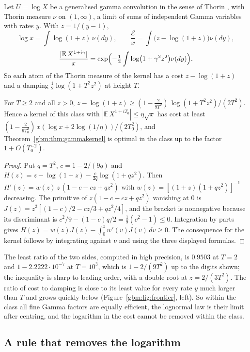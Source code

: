 Let $U=\log X$ be a generalised gamma convolution in the sense of Thorin \cite{Thorin78}, with Thorin measure $\nu$ on $(1,\infty)$, a limit of sums of independent Gamma variables with rates $y$. With $z=1/(y-1)$,
\[
\log x=\int\log(1+z)\,\nu(dy),\qquad\frac{\mathcal E}x=\int\bigl(z-\log(1+z)\bigr)\nu(dy),
\]
\[
\frac{|\mathbb E\,X^{1+i\gamma}|}x=\exp\Bigl(-\tfrac12\int\log\bigl(1+\gamma^2z^2\bigr)\nu(dy)\Bigr).
\]
So each atom of the Thorin measure of the kernel has a cost $z-\log(1+z)$ and a damping $\frac12\log(1+T^2z^2)$ at height $T$.

\begin{proposition}\label{gbm:prop:ggc}
For $T\ge2$ and all $z>0$, $z-\log(1+z)\ge(1-\frac2{9T^2})\,\log(1+T^2z^2)/(2T^2)$. Hence a kernel of this class with $|\mathbb E\,X^{1+iT_0}|\le\eta\sqrt x$ has cost at least $(1-\frac2{9T_0^2})\,x(\log x+2\log(1/\eta))/(2T_0^2)$, and Theorem~\ref{gbm:thm:gammakernel} is optimal in the class up to the factor $1+O(T_0^{-2})$.
\end{proposition}

\begin{proof}
Put $q=T^2$, $c=1-2/(9q)$ and $H(z)=z-\log(1+z)-\frac{c}{2q}\log(1+qz^2)$. Then $H'(z)=w(z)\,z\,(1-c-cz+qz^2)$ with $w(z)=[(1+z)(1+qz^2)]^{-1}$ decreasing. The primitive of $z(1-c-cz+qz^2)$ vanishing at $0$ is $J(z)=z^2[(1-c)/2-cz/3+qz^2/4]$, and the bracket is nonnegative because its discriminant is $c^2/9-(1-c)q/2=\frac19(c^2-1)\le0$. Integration by parts gives $H(z)=w(z)J(z)-\int_0^zw'(v)J(v)\,dv\ge0$. The consequence for the kernel follows by integrating against $\nu$ and using the three displayed formulas.
\end{proof}

The least ratio of the two sides, computed in high precision, is $0.9503$ at $T=2$ and $1-2.2222\cdot10^{-7}$ at $T=10^3$, which is $1-2/(9T^2)$ up to the digits shown; the inequality is sharp to leading order, with a double root at $z=2/(3T^2)$. The ratio of cost to damping is close to its least value for every rate $y$ much larger than $T$ and grows quickly below (Figure~\ref{gbm:fig:frontier}, left). So within the class all fine Gamma factors are equally efficient, the lognormal law is their limit after centring, and the logarithm in the cost cannot be removed within the class.
\subsection{A rule that removes the logarithm}


